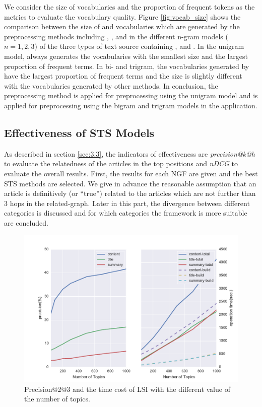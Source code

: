 We consider the size of \ifull{} vocabularies and the proportion of frequent tokens as the metrics to evaluate the vocabulary quality. Figure \ref{fig:vocab_size} shows the comparison between the size of \ifull{} and \icommon{} vocabularies which are generated by the preprocessing methods including \iSP{}, \iSE{}, \iST{} and \iSS{} in the different n-gram models ($n=1, 2, 3$) of the three types of text source containing \icontent{}, \ititle{} and \isummary{}. In the unigram model, \iSS{} always generates the vocabularies with the smallest size and the largest proportion of frequent terms. In bi- and trigram, the vocabularies generated by \iSE{} have the largest proportion of frequent terms and the size is slightly different with the vocabularies generated by other methods. In conclusion, the preprocessing method \iSS{} is applied for preprocessing using the unigram model and \iSE{} is applied for preprocessing using the bigram and trigram models in the application. 

\bigbreak



\subsection{Effectiveness of STS Models}
\label{sec:5.2}


As described in section \ref{sec:3.3}, the indicators of effectiveness are \textit{precision@k@h} to evaluate the relatedness of the articles in the top positions and \textit{nDCG} to evaluate the overall results. First, the results for each NGF are given and the best STS methods are selected. We give in advance the reasonable assumption that an article is definitively (or ``true'') related to the articles which are not further than $3$ hops in the related-graph. Later in this part, the divergence between different categories is discussed and for which categories the framework is more suitable are concluded.  
\begin{figure}[!htb]
    \centering
    \includegraphics[width=\textwidth]{fig/precision_topics}
    \caption{Precision@2@3 and the time cost of LSI with the different value of the number of topics. }
    \label{fig:precision_topics}
\end{figure}

